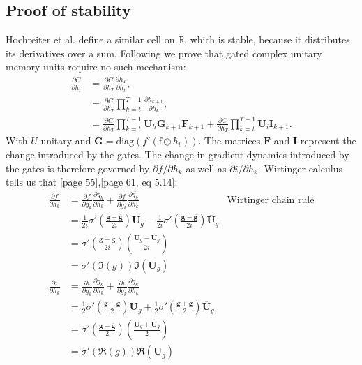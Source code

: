 \documentclass{article}
\begin{document}
\subsection{Proof of stability}
Hochreiter et al. \cite{Hochreiter} define a similar cell on $\mathbb{R}$, which is stable, because it distributes its derivatives over a sum. Following \cite{Arjovsky} we prove that gated complex unitary memory units require no such mechanism:
\begin{align}
\frac{\partial C}{\partial h_{t}} &= \frac{\partial C}{\partial h_T}\frac{\partial h_T}{\partial h_t}, 
                                     \label{eq:peep_cost} \\
                                  &= \frac{\partial C}{\partial h_T}\prod_{k=t}^{T-1}\frac{\partial h_{k+1}}{\partial h_k}, \\
                                  &= \frac{\partial C}{\partial h_T}\prod_{k=t}^{T-1}\mathbf{U}_h
                                  \mathbf{G}_{k+1} \mathbf{F}_{k+1} + \frac{\partial C}{\partial h_T}\prod_{k=t}^{T-1}\mathbf{U}_i\mathbf{I}_{k+1} .
\end{align}
With $U$ unitary and $\mathbf{G} = \text{diag} (f'(\text{f} \odot h_t))$. The matrices $\mathbf{F}$ and $\mathbf{I}$ represent the change introduced by the gates. The change in gradient dynamics introduced by the gates is therefore governed by $\partial f/ \partial h_k$ as well as $\partial i/ \partial h_k$. 
Wirtinger-calculus tells us that \cite{Remmert}[page 55],\cite{Mandic}[page 61, eq 5.14]:
\begin{align}
\frac{\partial f}{\partial h_k} &= \frac{\partial f}{\partial g_k}\frac{\partial g_k}{\partial h_k} + \frac{\partial f}{\partial \overline{g_k}}\frac{\partial \overline{g_k}}{\partial h_k}  & \text{Wirtinger chain rule}\\
                                &= \frac{1}{2i}\sigma'(\frac{\mathbf{g} - \overline{\mathbf{g}}}{2i})\mathbf{U}_g -
                                  \frac{1}{2i}\sigma'(\frac{\mathbf{g} - \overline{\mathbf{g}}}{2i})\overline{\mathbf{U}}_g \\
                                &= \sigma'(\frac{\mathbf{g} - \overline{\mathbf{g}}}{2i})(\frac{\mathbf{U}_g - \overline{\mathbf{U}}_g}{2i}) \\
                                &= \sigma'(\Im(g))\Im(\mathbf{U}_g) \\
\frac{\partial i}{\partial h_k} &= \frac{\partial i}{\partial g_k}\frac{\partial g_k}{\partial h_k} + \frac{\partial i}{\partial \overline{g_k}}\frac{\partial \overline{g_k}}{\partial h_k}  & \\
                                &= \frac{1}{2}\sigma'(\frac{\mathbf{g} + \overline{\mathbf{g}}}{2})\mathbf{U}_g + 
                                  \frac{1}{2}\sigma'(\frac{\mathbf{g} + \overline{\mathbf{g}}}{2})\overline{\mathbf{U}}_g \\
                                &= \sigma'(\frac{\mathbf{g} + \overline{\mathbf{g}}}{2})(\frac{\mathbf{U}_g + \overline{\mathbf{U}}_g}{2}) \\
                                &= \sigma'(\Re(g))\Re(\mathbf{U}_g) \\
\end{align}
\end{document}
